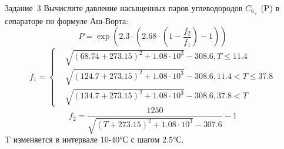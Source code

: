 \documentclass[aspectratio=169, mathserif]{beamer}	%
\begin{document}
\begin{frame}[fragile]{Задание~3}
\large
Вычислите давление насыщенных паров углеводородов $C_{6_{+}}$ (P) в сепараторе по формуле Аш-Ворта:
\begin{equation*}
	P = \exp \left(2.3 \cdot \left(2.68 \cdot \left(1 - \dfrac{f_2}{f_1}\right)-1\right)\right)
\end{equation*}
\begin{equation*}
	f_1 = \left\{
	\begin{aligned}
		& \sqrt{\left(68.74 + 273.15\right)^2 + 1.08 \cdot 10^3} - 308.6, T \leqslant 11.4 \\
		& \sqrt{\left(124.7 + 273.15\right)^2 + 1.08 \cdot 10^3} - 308.6, 11.4 < T \leqslant 37.8 \\
		& \sqrt{\left(134.7 + 273.15\right)^2 + 1.08 \cdot 10^3} - 308.6,  37.8 < T
	\end{aligned}
	\right.
\end{equation*}
\begin{equation*}
	f_2 = \dfrac{1250}{\sqrt{\left(T+273.15\right)^2 + 1.08 \cdot 10^3} - 307.6} - 1
\end{equation*}
T изменяется в интервале 10-40°С с шагом 2.5°С.
\vfill
\end{frame}


\end{document}
